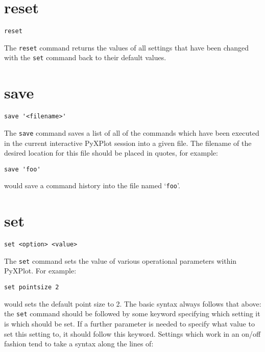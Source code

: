 \documentclass[a4paper,onecolumn,11pt]{book}
\begin{document}
\section{reset}

\begin{verbatim}
reset
\end{verbatim}

The {\tt reset} command returns the values of all settings that have been
changed with the {\tt set} command back to their default values.


\section{save}

\begin{verbatim}
save '<filename>'
\end{verbatim}

The {\tt save} command saves a list of all of the commands which have been
executed in the current interactive PyXPlot session into a given file. The
filename of the desired location for this file should be placed in quotes, for
example:

\begin{verbatim}
save 'foo'
\end{verbatim}

\noindent would save a command history into the file named `{\tt foo}'.


\section{set}

\begin{verbatim}
set <option> <value>
\end{verbatim}

The {\tt set} command sets the value of various operational parameters within
PyXPlot.  For example:

\begin{verbatim}
set pointsize 2
\end{verbatim}

would sets the default point size to 2. The basic syntax always follows that
above: the {\tt set} command should be followed by some keyword specifying which
setting it is which should be set. If a further parameter is needed to specify
what value to set this setting to, it should follow this keyword. Settings
which work in an on/off fashion tend to take a syntax along the lines of:
\end{document}
